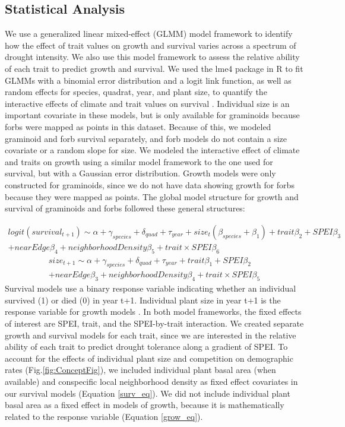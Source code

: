 \documentclass[12pt, letterpaper]{article}
\newcommand{\pkg}[1]{{\fontseries{b}\selectfont #1}}
\begin{document}
\subsection{Statistical Analysis} 
We use a generalized linear mixed-effect (GLMM) model framework to identify how the effect of trait values on growth and survival varies across a spectrum of drought intensity. We also use this model framework to assess the relative ability of each trait to predict growth and survival. We used the \pkg{lme4} package in \textsf{R} to fit GLMMs with a binomial error distribution and a logit link function, as well as random effects for species, quadrat, year, and plant size, to quantify the interactive effects of climate and trait values on survival \citep{RCoreTeam2019, Bates2015}. Individual size is an important covariate in these models, but is only available for graminoids because forbs were mapped as points in this dataset. Because of this, we modeled graminoid and forb survival separately, and forb models do not contain a size covariate or a random slope for size. We modeled the interactive effect of climate and traits on growth using a similar model framework to the one used for survival, but with a Gaussian error distribution. Growth models were only constructed for graminoids, since we do not have data showing growth for forbs because they were mapped as points. The global model structure for growth and survival of graminoids and forbs followed these general structures:

\begin{multline}
\label{surv_eq}
logit(survival_{t+1})\sim \alpha + \gamma_{species}+ \delta_{quad} + \tau_{year} + size_t(\beta_{species}  + \beta_1) + trait\beta_2+ SPEI\beta_3\\ + nearEdge\beta_4  + neighborhoodDensity\beta_5 + trait\times SPEI\beta_6
\end{multline}
\begin{multline}
\label{grow_eq} 
size_{t+1}\sim \alpha + \gamma_{species}+ \delta_{quad} + \tau_{year} +   trait\beta_1+ SPEI\beta_2\\ + nearEdge\beta_3  + neighborhoodDensity\beta_4 + trait\times SPEI\beta_5
\end{multline}
Survival models use a binary response variable indicating whether an individual survived (1) or died (0) in year t+1. Individual plant size in year t+1 is the response variable for growth models \citep{Dalgleish2011ClimatePlants, Dahlgren2009LinkingHerb}. In both model frameworks, the fixed effects of interest are SPEI, trait, and the SPEI-by-trait interaction. We created separate growth and survival models for each trait, since we are interested in the relative ability of each trait to predict drought tolerance along a gradient of SPEI. To account for the effects of individual plant size \citep{Tredennick2018} and competition on demographic rates (Fig.\ref{fig:ConceptFig}), we included individual plant basal area (when available) and conspecific local neighborhood density as fixed effect covariates in our survival models (Equation \ref{surv_eq}). We did not include individual plant basal area as a fixed effect in models of growth, because it is mathematically related to the response variable (Equation \ref{grow_eq}).
\end{document}
